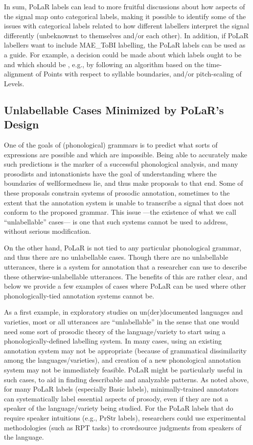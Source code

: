 \documentclass[11pt, twoside]{memoir}
\def\polar#1{{\relsize{-.5}\fontspec[Mapping=tex-text]{Roboto Mono}{#1}}}
\def\tobi#1{\polar{#1}}
\begin{document}
In sum, PoLaR labels can lead to more fruitful discussions about how aspects of the signal map onto categorical labels, making it possible to identify some of the issues with categorical labels related to how different labellers interpret the signal differently (unbeknownst to themselves and/or each other). In addition, if PoLaR labellers want to include MAE\_ToBI labelling, the PoLaR labels can be used as a guide.  For example, a decision could be made about which labels ought to be \tobi{H*} and which should be \tobi{L+H*}, e.g., by following an algorithm based on the time-alignment of Points with respect to syllable boundaries, and/or pitch-scaling of Levels.


\subsection{Unlabellable Cases Minimized by PoLaR’s Design}\label{sec:difficultunlabellable-cases}
One of the goals of (phonological) grammars is to predict what sorts of expressions are possible and which are impossible. Being able to accurately make such predictions is the marker of a successful phonological analysis, and many prosodists and intonationists have the goal of understanding where the boundaries of wellformedness lie, and thus make proposals to that end. Some of these proposals constrain systems of prosodic annotation, sometimes to the extent that the annotation system is unable to transcribe a signal that does not conform to the proposed grammar. This issue —the existence of what we call “unlabellable” cases— is one that such systems cannot be used to address, without serious modification.

On the other hand, PoLaR is not tied to any particular phonological grammar, and thus there are no unlabellable cases. Though there are no unlabellable utterances, there is a system for annotation that a researcher can use to describe these otherwise-unlabellable utterances. The benefits of this are rather clear, and below we provide a few examples of cases where PoLaR can be used where other phonologically-tied annotation systems cannot be.

As a first example, in exploratory studies on un(der)documented languages and varieties, most or all utterances are “unlabellable” in the sense that one would need some sort of prosodic theory of the language\slash variety to start using a phonologically-defined labelling system. In many cases, using an existing annotation system may not be appropriate (because of grammatical dissimilarity among the languages\slash varieties), and creation of a new phonological annotation system may not be immediately feasible. PoLaR might be particularly useful in such cases, to aid in finding describable and analyzable patterns. As noted above, for many PoLaR labels (especially Basic labels), minimally-trained annotators can systematically label essential aspects of prosody, even if they are not a speaker of the language\slash variety being studied. For the PoLaR labels that do require speaker intuitions (e.g., PrStr labels), researchers could use experimental methodologies (such as RPT tasks) to crowdsource judgments from speakers of the language.
\end{document}
